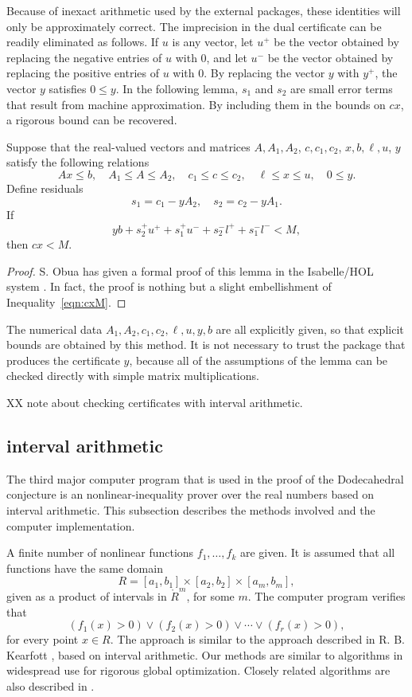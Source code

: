 Because of inexact arithmetic used by the external packages, 
these identities will only be
approximately correct.   The imprecision in the dual
certificate can be readily eliminated as follows. If $u$ is
any vector, let $u^+$ be the vector obtained by replacing the
negative entries of $u$ with $0$, and let $u^-$ be the vector
obtained by replacing the positive entries of $u$ with $0$.
By replacing the vector $y$ with $y^+$, the vector $y$ satisfies
$0\le y$.  In the following lemma, $s_1$ and $s_2$ are
small error terms that result from machine approximation.
By including them in the bounds on $c x$, a rigorous bound
can be recovered.


\begin{lemma}  Suppose that the real-valued vectors and matrices
$A,A_1,A_2$, $c,c_1,c_2$, $x,b,\ell,u$, $y$ satisfy the following
relations
  $$
  A x\le b, \quad A_1 \le A \le A_2,
  \quad c_1 \le c \le c_2,\quad \ell\le x\le u,\quad
  0\le y.
  $$
Define residuals
  $$
   s_1 = c_1 - y A_2,\quad s_2 = c_2  - y A_1.
  $$
If
$$
y b + s_2^+ u^+ + s_1^+ u^- + s_2^- l^+ + s_1^- l^- < M,
$$
then $c x < M$.
\end{lemma}

\begin{proof}  S. Obua has given a formal proof of this lemma in
the Isabelle/HOL system \cite[3.7.2]{Ob}.  In fact, the proof is
nothing but a slight
embellishment of Inequality~\ref{eqn:cxM}.
\end{proof}

The numerical data $A_1,A_2,c_1,c_2,\ell,u,y,b$ are all explicitly given,
so that explicit bounds are obtained by this
method.  It is not necessary to trust the package
that produces the certificate $y$, because
all of the assumptions of the lemma can be checked directly with
simple matrix multiplications.


XX note about checking certificates with interval arithmetic.

\subsection{interval arithmetic}

The third major computer program that is used in the proof of
the Dodecahedral conjecture is an nonlinear-inequality prover
over the real numbers based on interval arithmetic.  
This subsection describes the
methods involved and the computer implementation.

A finite number of nonlinear functions $f_1,\ldots,f_k$ are given.
It is assumed that all functions have the same domain
   $$R= [a_1,b_1] \times [a_2,b_2] \times [a_m,b_m],$$
given as a product of intervals in $\ring{R}^m$, for some $m$.
The computer program verifies that
  \begin{equation}\label{eqn:fpos}
  (f_1(x) >0) \lor (f_2(x) >0) \lor \cdots \lor (f_r(x) >0),
  \end{equation}
for every point $x\in R$.
The approach is similar to the approach described in
R. B. Kearfott \cite{Kea96}, based on interval arithmetic.
Our methods are similar to algorithms in widespread use for
rigorous global optimization.  Closely related algorithms
are also described in \cite{Zu}.

